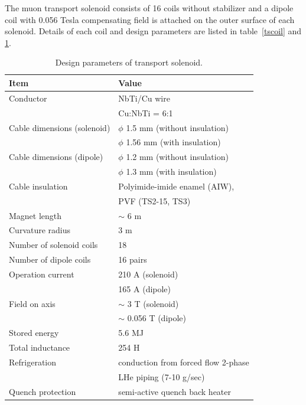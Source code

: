 The muon transport solenoid consists of 16 coils without stabilizer and a dipole coil with 0.056 Tesla compensating field is attached on the outer surface of each solenoid.
Details of each coil and design parameters are listed in table~\ref{tscoil} and \ref{designts}.
\begin{table}[H]
 \centering
 \begin{tabular}{ll} \hline \hline
  Item & Value \\ \hline
  Conductor & NbTi/Cu wire \\
   & Cu:NbTi = 6:1 \\
  Cable dimensions (solenoid) & $\phi$ 1.5 mm (without insulation) \\
   & $\phi$ 1.56 mm (with insulation) \\
  Cable dimensions (dipole) & $\phi$ 1.2 mm (without insulation) \\
   & $\phi$ 1.3 mm (with insulation) \\
  Cable insulation & Polyimide-imide enamel (AIW), \\
   & PVF (TS2-15, TS3) \\
  Magnet length & $\sim$ 6 m \\
  Curvature radius & 3 m \\
  Number of solenoid coils & 18 \\
  Number of dipole coils & 16 pairs \\
  Operation current & 210 A (solenoid) \\
   & 165 A (dipole) \\
  Field on axis & $\sim$ 3 T (solenoid) \\
   & $\sim$ 0.056 T (dipole) \\
  Stored energy & 5.6 MJ \\
  Total inductance & 254 H \\
  Refrigeration & conduction from forced flow 2-phase \\
   & LHe piping (7-10 g/sec) \\
  Quench protection & semi-active quench back heater \\ \hline \hline
 \end{tabular}
 \caption{Design parameters of transport solenoid.}
 \label{designts}
\end{table}

